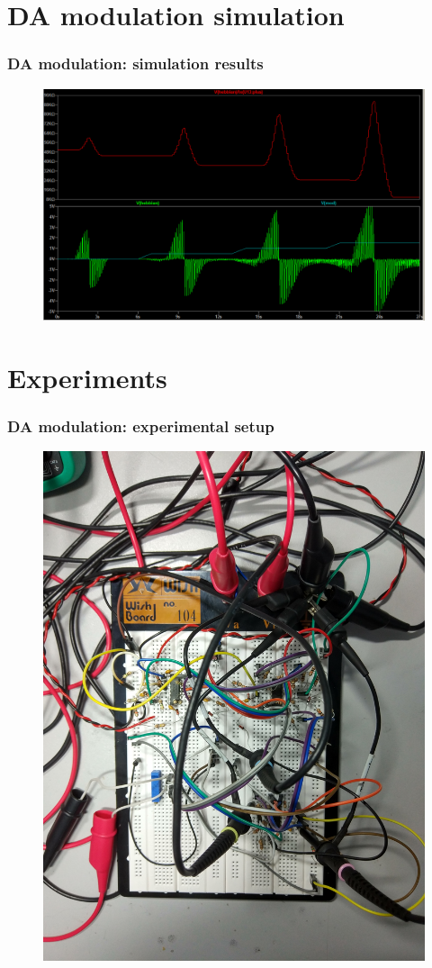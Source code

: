 \documentclass[12pt, aspectratio=169]{beamer}
\begin{document}
\section{DA modulation simulation}

\begin{frame}
\frametitle{DA modulation: simulation results}
\begin{figure}
\includegraphics[width=0.8\linewidth]{da_modulation}
\end{figure}
\end{frame}

\section{Experiments}

\begin{frame}
  \frametitle{DA modulation: experimental setup}
\begin{figure}
\includegraphics[width=0.5\linewidth, angle=90]{DA_STDP_modulation_physical_schematic}
\end{figure}
\end{frame}
\end{document}
